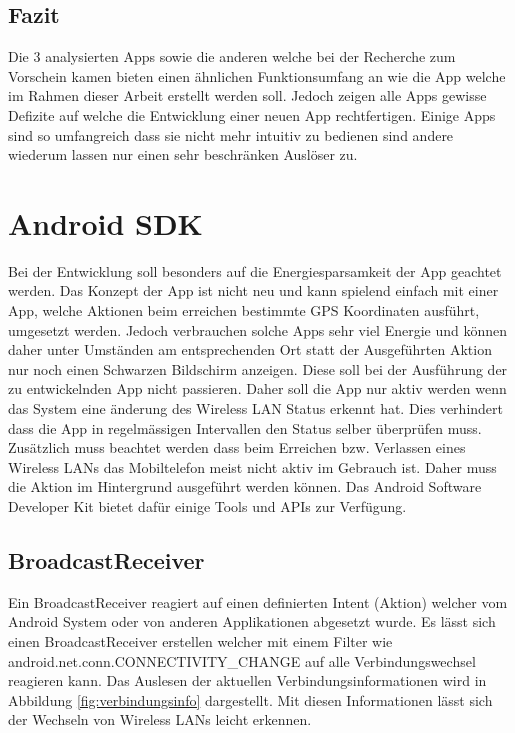 \subsection{Fazit}
Die 3 analysierten Apps sowie die anderen welche bei der Recherche zum Vorschein kamen bieten einen ähnlichen Funktionsumfang an wie die App welche im Rahmen dieser Arbeit erstellt werden soll. Jedoch zeigen alle Apps gewisse Defizite auf welche die Entwicklung einer neuen App rechtfertigen. Einige Apps sind so umfangreich dass sie nicht mehr intuitiv zu bedienen sind andere wiederum lassen nur einen sehr beschränken Auslöser zu.




\section{Android SDK}
Bei der Entwicklung soll besonders auf die Energiesparsamkeit der App geachtet werden. Das Konzept der App ist nicht neu und kann spielend einfach mit einer App, welche Aktionen beim erreichen bestimmte GPS Koordinaten ausführt, umgesetzt werden. Jedoch verbrauchen solche Apps sehr viel Energie und können daher unter Umständen am entsprechenden Ort statt der Ausgeführten Aktion nur noch einen Schwarzen Bildschirm anzeigen. Diese soll bei der Ausführung der zu entwickelnden App nicht passieren. Daher soll die App nur aktiv werden wenn das System eine änderung des Wireless LAN Status erkennt hat. Dies verhindert dass die App in regelmässigen Intervallen den Status selber überprüfen muss. Zusätzlich muss beachtet werden dass beim Erreichen bzw. Verlassen eines Wireless LANs das Mobiltelefon meist nicht aktiv im Gebrauch ist. Daher muss die Aktion im Hintergrund ausgeführt werden können. Das Android Software Developer Kit bietet dafür einige Tools und APIs zur Verfügung.

\subsection{BroadcastReceiver}
Ein BroadcastReceiver reagiert auf einen definierten Intent (Aktion) welcher vom Android System oder von anderen Applikationen abgesetzt wurde. Es lässt sich einen BroadcastReceiver erstellen welcher mit einem Filter wie \glqq android.net.conn.CONNECTIVITY\_CHANGE\grqq{} auf alle Verbindungswechsel reagieren kann. Das Auslesen der aktuellen Verbindungsinformationen wird in Abbildung \ref{fig:verbindungsinfo} dargestellt. Mit diesen Informationen lässt sich der Wechseln von Wireless LANs leicht erkennen.

